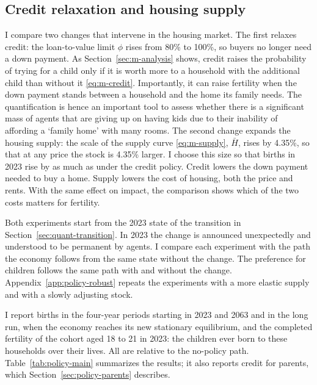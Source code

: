 \subsection{Credit relaxation and housing supply}
\label{sec:policy-design}

I compare two changes that intervene in the housing market. The first relaxes
credit: the loan-to-value limit $\phi$ rises from 80\% to 100\%, so buyers no
longer need a down payment. As Section~\ref{sec:m-analysis} shows, credit
raises the probability of trying for a child only if it is worth more to a
household with the additional child than without it \eqref{eq:m-credit}. Importantly, it
can raise fertility when the down payment stands between a household and the
home its family needs. The quantification is hence an important tool to assess whether there is a significant mass of agents that are giving up on having kids due to their inability of affording a `family home' with many rooms. The second change expands the housing supply: the scale of
the supply curve \eqref{eq:m-supply}, $\bar H$, rises by 4.35\%, so that at any price the stock
is 4.35\% larger. I choose this size so that births in 2023 rise by as
much as under the credit policy. Credit lowers the down payment needed to buy a home.
Supply lowers the cost of housing, both the price and rents. With the same
effect on impact, the comparison shows which of the two costs matters for
fertility.

Both experiments start from the 2023 state of the transition in
Section~\ref{sec:quant-transition}. In 2023 the change is announced unexpectedly and
understood to be permanent by agents. I compare each experiment with the path the economy follows from
the same state without the change. The preference for children follows the
same path with and without the change. Appendix~\ref{app:policy-robust} repeats the
experiments with a more elastic supply and with a slowly adjusting stock.

I report births in the four-year periods starting in 2023 and 2063 and in the
long run, when the economy reaches its new stationary equilibrium, and the
completed fertility of the cohort aged 18 to 21 in 2023: the children ever
born to these households over their lives. All are relative to the no-policy
path. Table~\ref{tab:policy-main} summarizes the results; it also reports
credit for parents, which Section~\ref{sec:policy-parents} describes.

